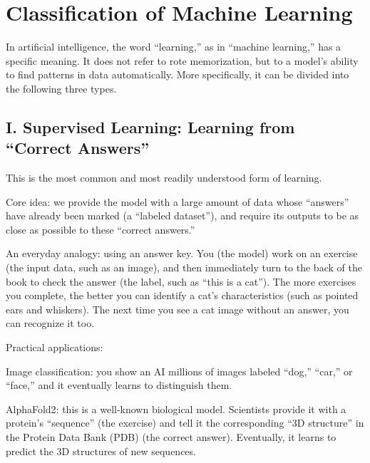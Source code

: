 \setcounter{section}{0}

\hypertarget{classification-of-machine-learning}{%
\section{Classification of Machine Learning}\label{classification-of-machine-learning}}

In artificial intelligence, the word ``learning,'' as in ``machine learning,'' has a specific meaning. It does not refer to rote memorization, but to a model's ability to find patterns in data automatically. More specifically, it can be divided into the following three types.

\hypertarget{i.-supervised-learning-learning-from-correct-answers}{%
\subsection{I. Supervised Learning: Learning from ``Correct Answers''}\label{i.-supervised-learning-learning-from-correct-answers}}

This is the most common and most readily understood form of learning.

Core idea: we provide the model with a large amount of data whose ``answers'' have already been marked (a ``labeled dataset''), and require its outputs to be as close as possible to these ``correct answers.''

An everyday analogy: using an answer key. You (the model) work on an exercise (the input data, such as an image), and then immediately turn to the back of the book to check the answer (the label, such as ``this is a cat''). The more exercises you complete, the better you can identify a cat's characteristics (such as pointed ears and whiskers). The next time you see a cat image without an answer, you can recognize it too.

Practical applications:

Image classification: you show an AI millions of images labeled ``dog,'' ``car,'' or ``face,'' and it eventually learns to distinguish them.

AlphaFold2: this is a well-known biological model. Scientists provide it with a protein's ``sequence'' (the exercise) and tell it the corresponding ``3D structure'' in the Protein Data Bank (PDB) (the correct answer). Eventually, it learns to predict the 3D structures of new sequences.

